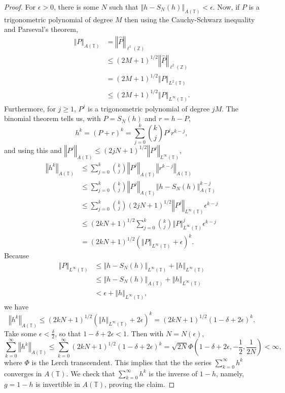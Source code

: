 \documentclass{article}
\newcommand{\norm}[1]{\left\Vert #1 \right\Vert}
\theoremstyle{definition}
\begin{document}
\begin{proof}
For $\epsilon>0$, there is some $N$ such that
$\norm{h-S_N(h)}_{A(\mathbb{T})}<\epsilon$. 
Now, if $P$ is a trigonometric polynomial of degree $M$ then using the Cauchy-Schwarz
inequality and Parseval's theorem, 
\begin{align*}
\norm{P}_{A(\mathbb{T})}&=\norm{\hat{P}}_{\ell^1(\mathbb{Z})}\\
&\leq (2M+1)^{1/2} \norm{\hat{P}}_{\ell^2(\mathbb{Z})}\\
&= (2M+1)^{1/2} \norm{P}_{L^2(\mathbb{T})}\\
&\leq (2M+1)^{1/2} \norm{P}_{L^\infty(\mathbb{T})}.
\end{align*}
Furthermore, for $j \geq 1$, $P^j$ is a trigonometric polynomial of degree $jM$. 
The binomial theorem tells us, with $P=S_N(h)$ and $r=h-P$,
\[
h^k=(P+r)^k = \sum_{j=0}^k \binom{k}{j} P^j r^{k-j},
\]
and using this and $\norm{P^j}_{A(\mathbb{T})} \leq
(2jN+1)^{1/2} \norm{P^j}_{L^\infty(\mathbb{T})}$,
\begin{align*}
\norm{h^k}_{A(\mathbb{T})}&\leq  \sum_{j=0}^k \binom{k}{j} \norm{P^j}_{A(\mathbb{T})}
\norm{r^{k-j}}_{A(\mathbb{T})}\\
&\leq  \sum_{j=0}^k \binom{k}{j} \norm{P^j}_{A(\mathbb{T})}
\norm{h-S_N(h)}_{A(\mathbb{T})}^{k-j}\\
&\leq  \sum_{j=0}^k \binom{k}{j} (2jN+1)^{1/2} \norm{P^j}_{L^\infty(\mathbb{T})} \epsilon^{k-j}\\
&\leq (2kN+1)^{1/2} \sum_{j=0}^k \binom{k}{j}  \norm{P}_{L^\infty(\mathbb{T})}^j \epsilon^{k-j}\\
&= (2kN+1)^{1/2} (\norm{P}_{L^\infty(\mathbb{T})}+\epsilon)^k.
\end{align*}
Because
\begin{align*}
\norm{P}_{L^\infty(\mathbb{T})} & \leq \norm{h-S_N(h)}_{L^\infty(\mathbb{T})}
+\norm{h}_{L^\infty(\mathbb{T})}\\
&\leq \norm{h-S_N(h)}_{A(\mathbb{T})}
+\norm{h}_{L^\infty(\mathbb{T})}\\
&<\epsilon+\norm{h}_{L^\infty(\mathbb{T})},
\end{align*}
we have
\[
\norm{h^k}_{A(\mathbb{T})} \leq  (2kN+1)^{1/2} (\norm{h}_{L^\infty(\mathbb{T})}+2\epsilon)^k
= (2kN+1)^{1/2} (1-\delta+2\epsilon)^k.
\]
Take some $\epsilon<\frac{\delta}{2}$, so that $1-\delta+2\epsilon<1$. Then with $N=N(\epsilon)$,
\[
\sum_{k=0}^\infty \norm{h^k}_{A(\mathbb{T})} \leq \sum_{k=0}^\infty
 (2kN+1)^{1/2} (1-\delta+2\epsilon)^k
 =\sqrt{2N} \Phi\left(1-\delta+2\epsilon,-\frac{1}{2},\frac{1}{2N}\right)<\infty,
  \]
  where $\Phi$ is the Lerch transcendent. This implies that the 
  the series $\sum_{k=0}^\infty h^k$ converges in $A(\mathbb{T})$. We check that
  $\sum_{k=0}^\infty h^k$ is the inverse of $1-h$, namely, $g=1-h$ is invertible in
  $A(\mathbb{T})$, proving the claim.
\end{proof}
\end{document}
